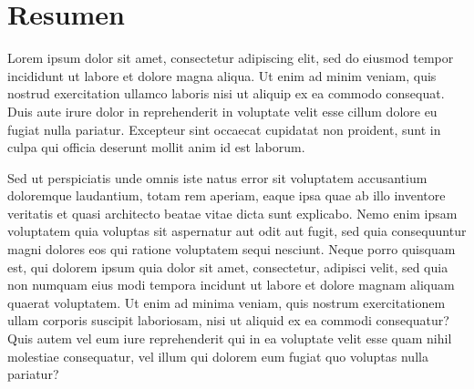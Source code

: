 \documentclass[12pt,a4paper,oneside]{book} %
\begin{document}
\chapter*{Resumen}
\thispagestyle{empty}
Lorem ipsum dolor sit amet, consectetur adipiscing elit, sed do eiusmod tempor incididunt ut labore et dolore magna aliqua. Ut enim ad minim veniam, quis nostrud exercitation ullamco laboris nisi ut aliquip ex ea commodo consequat. Duis aute irure dolor in reprehenderit in voluptate velit esse cillum dolore eu fugiat nulla pariatur. Excepteur sint occaecat cupidatat non proident, sunt in culpa qui officia deserunt mollit anim id est laborum.

Sed ut perspiciatis unde omnis iste natus error sit voluptatem accusantium doloremque laudantium, totam rem aperiam, eaque ipsa quae ab illo inventore veritatis et quasi architecto beatae vitae dicta sunt explicabo. Nemo enim ipsam voluptatem quia voluptas sit aspernatur aut odit aut fugit, sed quia consequuntur magni dolores eos qui ratione voluptatem sequi nesciunt. Neque porro quisquam est, qui dolorem ipsum quia dolor sit amet, consectetur, adipisci velit, sed quia non numquam eius modi tempora incidunt ut labore et dolore magnam aliquam quaerat voluptatem. Ut enim ad minima veniam, quis nostrum exercitationem ullam corporis suscipit laboriosam, nisi ut aliquid ex ea commodi consequatur? Quis autem vel eum iure reprehenderit qui in ea voluptate velit esse quam nihil molestiae consequatur, vel illum qui dolorem eum fugiat quo voluptas nulla pariatur?
\thispagestyle{empty}
\setcounter{page}{1}
\tableofcontents
\listoftables
\listoffigures
\end{document}
